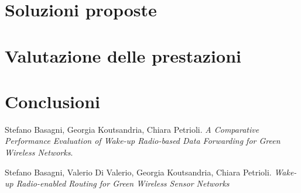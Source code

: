 \documentclass[binding=0.6cm,TFA]{sapthesis}
\begin{document}
\chapter{Soluzioni proposte}
\chapter{Valutazione delle prestazioni}
\chapter{Conclusioni}

\backmatter
\cleardoublepage
{} %

\begin{thebibliography}{9}

    Stefano Basagni, Georgia Koutsandria, Chiara Petrioli.
    \textit{A Comparative Performance Evaluation of Wake-up Radio-based Data Forwarding for Green Wireless Networks}.

    Stefano Basagni, Valerio Di Valerio, Georgia Koutsandria, Chiara Petrioli.
    \textit{Wake-up Radio-enabled Routing for Green Wireless Sensor Networks}
\end{thebibliography}
\end{document}
